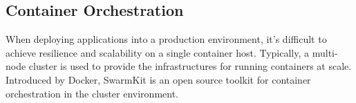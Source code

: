 \begin{comment}
Fig~\ref{fig:docker-standalone} illustrates the structure of a physical machine 
that is hosting four Docker containers for two applications. As the figure shows, the $AppA$ includes two services that are provided by $AppA1$ and $AppA2$ 
and $AppB$ contains one service which is provided by two Docker containers, $AppB1$ and $AppB1\textprime$.


\begin{figure}[ht]
   \centering
      \begin{minipage}[t]{0.48\linewidth}
\centering
\texttt{[image: docker-standalone]}
\caption{Docker Containers}
\label{fig:docker-standalone}
      \end{minipage} %
      \begin{minipage}[t]{0.48\linewidth}
\centering
\texttt{[image: swarmkit]}
\caption{Docker Swarmkit}
\label{fig:swarmkit} 
      \end{minipage} %
\end{figure}


\begin{comment}
\begin{figure}[ht]
\centering
\texttt{[image: swarmkit]}
\caption{Docker Swarmkit}
\label{fig:swarmkit} 
\end{figure}
\end{comment}


\subsection{Container Orchestration}
When deploying applications into a production environment, it's difficult to achieve resilience and scalability on a single container host. 
Typically, a multi-node cluster is used to provide the infrastructures for running containers at scale. Introduced by Docker, SwarmKit is an open source toolkit
for container orchestration in the cluster environment. 


